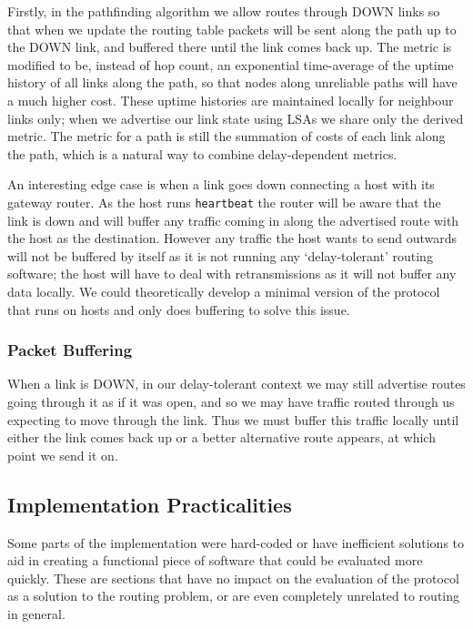\documentclass[10pt,twoside,a4paper]{article}
\begin{document}
Firstly, in the pathfinding algorithm we allow routes through DOWN links so that when we update the routing table packets will be sent along the path up to the DOWN link, and buffered there until the link comes back up. The metric is modified to be, instead of hop count, an exponential time-average of the uptime history of all links along the path, so that nodes along unreliable paths will have a much higher cost. These uptime histories are maintained locally for neighbour links only; when we advertise our link state using LSAs we share only the derived metric. The metric for a path is still the summation of costs of each link along the path, which is a natural way to combine delay-dependent metrics.

An interesting edge case is when a link goes down connecting a host with its gateway router. As the host runs \texttt{heartbeat} the router will be aware that the link is down and will buffer any traffic coming in along the advertised route with the host as the destination. However any traffic the host wants to send outwards will not be buffered by itself as it is not running any `delay-tolerant' routing software; the host will have to deal with retransmissions as it will not buffer any data locally. We could theoretically develop a minimal version of the protocol that runs on hosts and only does buffering to solve this issue.

\subsubsection{Packet Buffering}

When a link is DOWN, in our delay-tolerant context we may still advertise routes going through it as if it was open, and so we may have traffic routed through us expecting to move through the link. Thus we must buffer this traffic locally until either the link comes back up or a better alternative route appears, at which point we send it on.


\subsection{Implementation Practicalities}

Some parts of the implementation were hard-coded or have inefficient solutions to aid in creating a functional piece of software that could be evaluated more quickly. These are sections that have no impact on the evaluation of the protocol as a solution to the routing problem, or are even completely unrelated to routing in general.
\end{document}

